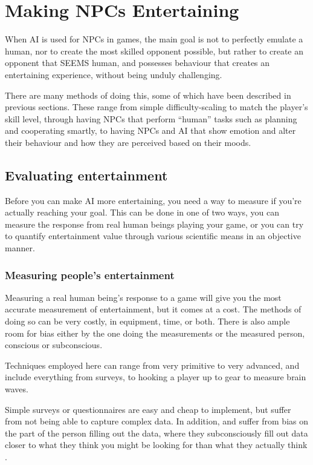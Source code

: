 \documentclass[]{report}
\let\oldmarginpar\marginpar
\renewcommand\marginpar[1]{\-\oldmarginpar[\raggedleft\footnotesize #1]%
{\raggedright\footnotesize #1}}
\begin{document}
\chapter{Making NPCs Entertaining}
\label{cha:npc-entert-value}

When AI is used for NPCs in games, the main goal is not to perfectly emulate a
human, nor to create the most skilled opponent possible, but rather to create an
opponent that SEEMS human, and possesses behaviour that creates an entertaining
experience, without being unduly challenging.

There are many methods of doing this, some of which have been described in
previous sections\marginpar{Link back?}. These range from simple
difficulty-scaling to match the player's skill level, through having NPCs that
perform ``human'' tasks such as planning and cooperating smartly, to having NPCs
and AI that show emotion and alter their behaviour and how they are perceived
based on their moods.

\section{Evaluating entertainment}
\label{sec:eval-entert}

Before you can make AI more entertaining, you need a way to measure if you're
actually reaching your goal. This can be done in one of two ways, you can
measure the response from real human beings playing your game, or you can try to
quantify entertainment value through various scientific means in an objective
manner.

\subsection{Measuring people's entertainment}
\label{sec:measuring-people}

Measuring a real human being's response to a game will give you the most
accurate measurement of entertainment, but it comes at a cost. The methods of
doing so can be very costly, in equipment, time, or both. There is also ample
room for bias either by the one doing the measurements or the measured person,
conscious or subconscious.

Techniques employed here can range from very primitive to very advanced, and
include everything from surveys, to hooking a player up to gear to measure brain
waves.

Simple surveys or questionnaires are easy and cheap to implement, but suffer from
not being able to capture complex data. In addition, and suffer from bias on the
part of the person filling out the data, where they subconsciously fill out data
closer to what they think you might be looking for than what they actually think
\citep{mandryk2006using}.
\end{document}

